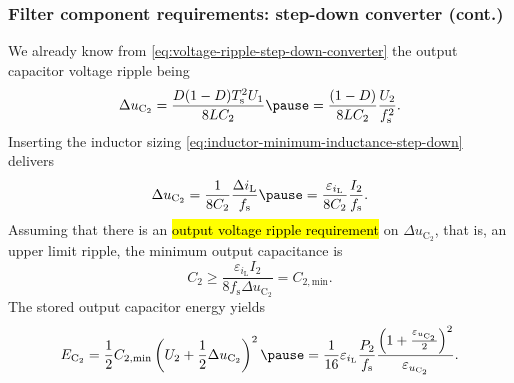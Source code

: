 \begin{frame}
    \frametitle{Filter component requirements: step-down converter (cont.)}
    We already know from \eqref{eq:voltage-ripple-step-down-converter} the output capacitor voltage ripple being
    \begin{equation*}
        \Delta u_\mathrm{C_2} = \frac{D(1-D)T_\mathrm{s}^2U_1}{8LC_2} \pause = \frac{(1-D)}{8LC_2}\frac{U_2}{f_\mathrm{s}^2}.
    \end{equation*}  \pause
    Inserting the inductor sizing \eqref{eq:inductor-minimum-inductance-step-down} delivers
    \begin{equation}
        \Delta u_\mathrm{C_2} = \frac{1}{8C_2} \frac{\Delta i_\mathrm{L}}{f_\mathrm{s}}\pause = \frac{\varepsilon_{i_\mathrm{L}}}{8C_2} \frac{I_2}{f_\mathrm{s}}.
    \end{equation}\pause
    Assuming that there is an \hl{output voltage ripple requirement} on $\Delta u_\mathrm{C_2}$, that is, an upper limit ripple, the minimum output capacitance is 
    \begin{equation}
        C_2 \geq \frac{\varepsilon_{i_\mathrm{L}}I_2}{8f_\mathrm{s}\Delta u_\mathrm{C_2}} = C_{2,\mathrm{min}}.
    \end{equation}\pause
    The stored output capacitor energy yields
    \begin{equation}
        E_\mathrm{C_2} = \frac{1}{2} C_{2,\mathrm{min}} \left(U_2 + \frac{1}{2}\Delta u_\mathrm{C_2}\right)^2 \pause = \frac{1}{16} \varepsilon_{i_\mathrm{L}}\frac{P_2}{f_\mathrm{s}}\frac{\left(1+\frac{\varepsilon_{u_\mathrm{C_2}}}{2}\right)^2}{\varepsilon_{u_\mathrm{C_2}}}.
    \end{equation}
\end{frame}


